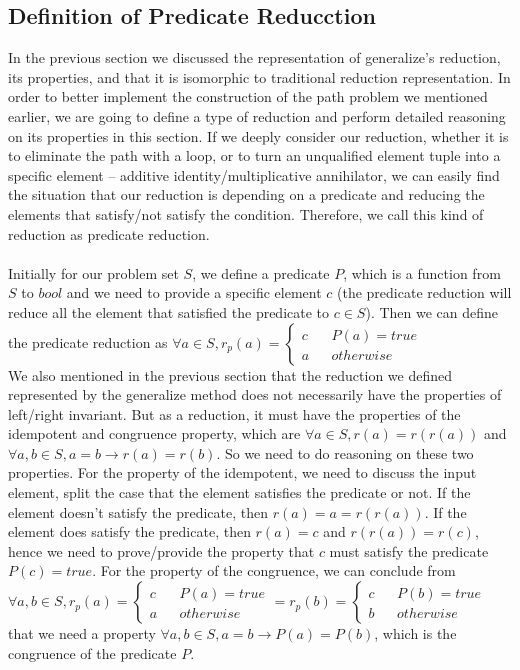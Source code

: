 \documentclass[a4paper,10pt]{article}
\begin{document}
\subsection{Definition of Predicate Reducction}
In the previous section we discussed the representation of generalize's reduction, its properties, and that it is isomorphic to traditional reduction representation. In order to better implement the construction of the path problem we mentioned earlier, we are going to define a type of reduction and perform detailed reasoning on its properties in this section. 
If we deeply consider our reduction, whether it is to eliminate the path with a loop, or to turn an unqualified element tuple into a specific element -- additive identity/multiplicative annihilator, we can easily find the situation that our reduction is depending on a predicate and reducing the elements that satisfy/not satisfy the condition. Therefore, we call this kind of reduction as predicate reduction.\\\\
Initially for our problem set $S$, we define a predicate $P$, which is a function from $S$ to $bool$ and we need to provide a specific element $c$ (the predicate reduction will reduce all the element that satisfied the predicate to $c \in S$). Then we can define the predicate reduction as $\forall a \in S,  r_p(a)=\left\{
\begin{aligned}
c &  & P(a) = true \\
a &  & otherwise 
\end{aligned}
\right.$\\
We also mentioned in the previous section that the reduction we defined represented by the generalize method does not necessarily have the properties of left/right invariant. 
But as a reduction, it must have the properties of the idempotent and congruence property, which are $\forall a \in S, r(a) = r(r(a))$ and $\forall a,b\in S, a = b \rightarrow r(a) = r(b)$. So we need to do reasoning on these two properties. For the property of the idempotent, we need to discuss the input element, split the case that the element satisfies the predicate or not. If the element doesn't satisfy the predicate, then $r(a) = a = r(r(a))$. If the element does satisfy the predicate, then $r(a) = c$ and $r(r(a)) = r(c)$, hence we need to prove/provide the property that $c$ must satisfy the predicate $P(c) = true$. For the property of the congruence, we can conclude from $\forall a,b \in S, r_p(a)=\left\{
\begin{aligned}
c &  & P(a) = true \\
a &  & otherwise 
\end{aligned}
\right. = 
r_p(b)=\left\{
\begin{aligned}
c &  & P(b) = true \\
b &  & otherwise 
\end{aligned}
\right.$ that we need a property $\forall a,b \in S, a = b \rightarrow P(a) = P(b)$, which is the congruence of the predicate $P$.\\
\end{document}
